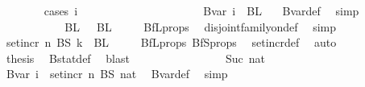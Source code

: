 \begin{isabellebody}
\ \ \ \ \ \ \isamarkupfalse%
\ {\isacharparenleft}{\kern0pt}cases\ i{\isacharparenright}{\kern0pt}\isanewline
\ \ \ \ \ \ \ \ \isamarkupfalse%
\ {}\isanewline
\ \ \ \ \ \ \ \ \isamarkupfalse%
\ \isamarkupfalse%
\ {\isachardoublequoteopen}Bvar\ i\ {\isacharequal}{\kern0pt}\ BL\ {}{\isachardoublequoteclose}\ \isamarkupfalse%
\ Bvar{\isacharunderscore}{\kern0pt}def\ \isamarkupfalse%
\ simp\isanewline
\ \ \ \ \ \ \ \ \isamarkupfalse%
\ \isamarkupfalse%
\ {\isachardoublequoteopen}BL\ {}\ {\isasyminter}\ BL\ {}\ {\isacharequal}{\kern0pt}\ {\isacharbraceleft}{\kern0pt}{\isacharbraceright}{\kern0pt}{\isachardoublequoteclose}\ \isamarkupfalse%
\ BfL{\isacharunderscore}{\kern0pt}props\ \isamarkupfalse%
\ disjoint{\isacharunderscore}{\kern0pt}family{\isacharunderscore}{\kern0pt}on{\isacharunderscore}{\kern0pt}def\ \isamarkupfalse%
\ simp\isanewline
\ \ \ \ \ \ \ \ \isamarkupfalse%
\ \isamarkupfalse%
\ {\isachardoublequoteopen}set{\isacharunderscore}{\kern0pt}incr\ n\ {\isacharparenleft}{\kern0pt}BS\ k{\isacharparenright}{\kern0pt}\ {\isasyminter}\ BL\ {}\ {\isacharequal}{\kern0pt}\ {\isacharbraceleft}{\kern0pt}{\isacharbraceright}{\kern0pt}{\isachardoublequoteclose}\ \isamarkupfalse%
\ BfL{\isacharunderscore}{\kern0pt}props\ BfS{\isacharunderscore}{\kern0pt}props\ \isamarkupfalse%
\ set{\isacharunderscore}{\kern0pt}incr{\isacharunderscore}{\kern0pt}def\ \isamarkupfalse%
\ auto\isanewline
\ \ \ \ \ \ \ \ \isamarkupfalse%
\ \isamarkupfalse%
\ {\isacharquery}{\kern0pt}thesis\ \isamarkupfalse%
\ Bstat{\isacharunderscore}{\kern0pt}def\ \isamarkupfalse%
\ blast\isanewline
\ \ \ \ \ \ \isamarkupfalse%
\isanewline
\ \ \ \ \ \ \ \ \isamarkupfalse%
\ {\isacharparenleft}{\kern0pt}Suc\ nat{\isacharparenright}{\kern0pt}\isanewline
\ \ \ \ \ \ \ \ \isamarkupfalse%
\ \isamarkupfalse%
\ {\isachardoublequoteopen}Bvar\ i\ {\isacharequal}{\kern0pt}\ set{\isacharunderscore}{\kern0pt}incr\ n\ {\isacharparenleft}{\kern0pt}BS\ nat{\isacharparenright}{\kern0pt}{\isachardoublequoteclose}\ \isamarkupfalse%
\ Bvar{\isacharunderscore}{\kern0pt}def\ \isamarkupfalse%
\ simp\isanewline

\end{isabellebody}
